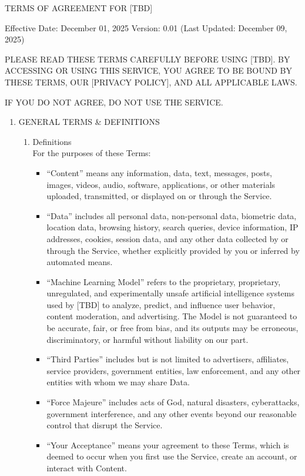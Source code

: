 \documentclass{standalone}
\begin{document}
	
	TERMS OF AGREEMENT FOR [TBD]
	
	Effective Date: December 01, 2025 Version: 0.01 (Last Updated: December 09, 2025)
			
	PLEASE READ THESE TERMS CAREFULLY BEFORE USING [TBD]. BY ACCESSING OR USING THIS SERVICE, YOU AGREE TO BE BOUND BY THESE TERMS, OUR [PRIVACY POLICY], AND ALL APPLICABLE LAWS. 
	
	IF YOU DO NOT AGREE, DO NOT USE THE SERVICE.
			
	\begin{enumerate}[label=\arabic*., noitemsep,leftmargin=*]
		\item GENERAL TERMS \& DEFINITIONS
		\begin{enumerate}[label*=\arabic*., noitemsep,leftmargin=*]
			\item Definitions\\
			For the purposes of these Terms: 
			\begin{itemize}[noitemsep,leftmargin=*]
				\item [-] “Content” means any information, data, text, messages, posts, images, videos, audio, software, applications, or other materials uploaded, transmitted, or displayed on or through the Service. 
				\item [-] “Data” includes all personal data, non-personal data, biometric data, location data, browsing history, search queries, device information, IP addresses, cookies, session data, and any other data collected by or through the Service, whether explicitly provided by you or inferred by automated means. 
				\item [-] “Machine Learning Model” refers to the proprietary, proprietary, unregulated, and experimentally unsafe artificial intelligence systems used by [TBD] to analyze, predict, and influence user behavior, content moderation, and advertising. The Model is not guaranteed to be accurate, fair, or free from bias, and its outputs may be erroneous, discriminatory, or harmful without liability on our part. 
				\item [-] “Third Parties” includes but is not limited to advertisers, affiliates, service providers, government entities, law enforcement, and any other entities with whom we may share Data. 
				\item [-] “Force Majeure” includes acts of God, natural disasters, cyberattacks, government interference, and any other events beyond our reasonable control that disrupt the Service. 
				\item [-] “Your Acceptance” means your agreement to these Terms, which is deemed to occur when you first use the Service, create an account, or interact with Content.

\end{itemize}
\end{enumerate}
\end{enumerate}
\end{document}
